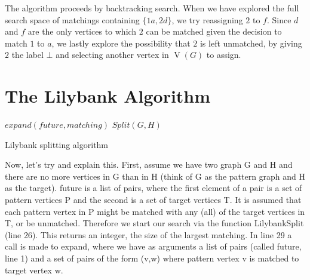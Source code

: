 \documentclass[letterpaper]{article}
\DeclareMathOperator{\V}{V}
\begin{document}
The algorithm proceeds by backtracking search. When we have explored the full
search space of matchings containing $\{1a, 2d\}$, we try reassigning $2$ to
$f$.  Since $d$ and $f$ are the only vertices to which $2$ can be matched given
the decision to match $1$ to $a$, we lastly explore the possibility that $2$ is
left unmatched, by giving $2$ the label $\bot$ and selecting another vertex in
$\V(G)$ to assign.



\section{The Lilybank Algorithm}

\begin{algorithm}
\DontPrintSemicolon
\nl $expand(\mathit{future},matching)$ \;
\nl {}
\;
\nl $Split(G,H)$ \;
\nl {}
\caption{Lilybank splitting algorithm}
\label{jtAlg}
\end{algorithm}

Now, let's try and explain this. First, assume we have two graph G and H and there are no more vertices in G than in H (think of G as the pattern graph and H as the target).
future is a list of pairs, where the first element of a pair is a set of pattern vertices P and the second is a set of target vertices T. It is assumed that each pattern vertex in P 
might be matched with any (all) of the target vertices in T, or be unmatched. Therefore we start our search via the function LilybankSplit (line 26). This returns an integer, the size of the largest matching.
In line 29 a call is made to expand, where we have as arguments a list of pairs (called future, line 1) and a set of pairs of the form (v,w) where pattern vertex v is matched to target vertex w.
\end{document}

